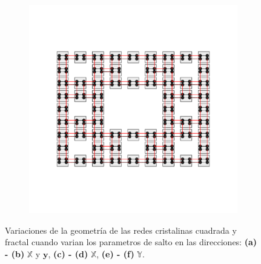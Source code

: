 \begin{figure}[h!]
\begin{minipage}[h!]{1.0\textwidth}
\begin{subfigure}[b!]{0.2 \textwidth}
         \end{subfigure}\hspace*{-0.5em}
         \begin{subfigure}[b!]{0.2 \textwidth}
             \caption*{}
             \includegraphics[width=\textwidth]{Imagenes/Models/Model_pump/fractal_pump_model_y_16.pdf}
         \end{subfigure}\hspace*{-0.5em}
     \end{minipage}\vspace*{-0.2em}     
    \caption{Variaciones de la geometría de las redes cristalinas cuadrada y fractal cuando varian los parametros de salto en las direcciones: \textbf{(a) - (b)} $\mathbb{X}$ y $\mathbf{y}$, \textbf{(c) - (d)} $\mathbb{X}$, \textbf{(e) - (f)} $\mathbb{Y}$. }
    \label{fig:Model_pump}
\end{figure}